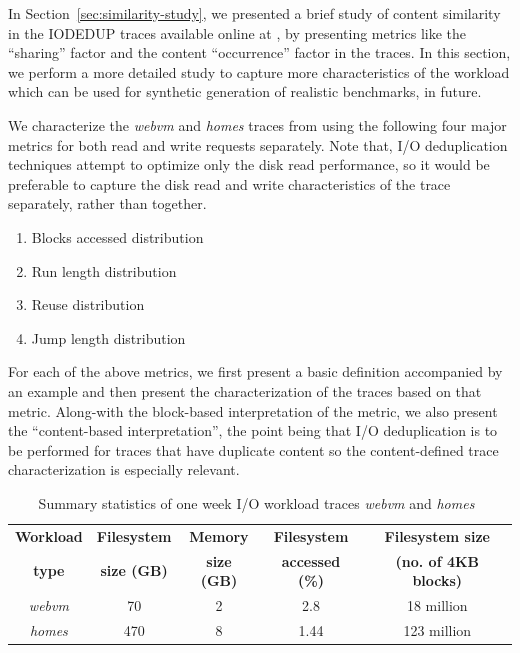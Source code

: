 In Section~\ref{sec:similarity-study}, we presented a brief study
of content similarity in the IODEDUP traces available online 
at \cite{iodedup-online}, by presenting 
metrics like the ``sharing'' factor and the content ``occurrence'' factor
in the traces. In this section, we perform a more detailed study
to capture more characteristics of the workload
which can be used for synthetic generation of realistic
benchmarks, in future.

We characterize the \textit{webvm} and \textit{homes} traces from \cite{iodedup-online}
using the following four major
metrics for both read and write requests separately. Note that, I/O
deduplication techniques attempt to optimize only the disk read performance,
so it would be preferable to capture the disk read and write characteristics
of the trace separately, rather than together. 
\begin{enumerate}
		\singlespacing
	\item Blocks accessed distribution
	\item Run length distribution
	\item Reuse distribution
	\item Jump length distribution
\end{enumerate}

For each of the above metrics, we first present a basic definition 
accompanied by an example and then present the characterization of the
traces based on that metric. Along-with the block-based interpretation of
the metric, we also present the ``content-based interpretation'', the point
being that I/O deduplication is to be performed for traces that have
duplicate content so the content-defined trace characterization is especially
relevant.

 \begin{table}[t]
 \caption{Summary statistics of one week I/O workload traces \textit{webvm} and \textit{homes}~\cite{iodedup}}
 \begin{center}
 \begin{tabular}{|c|c|c|c|c|} \hline
   \bf{Workload} & \bf{Filesystem} & \bf{Memory} & \bf{Filesystem} & \bf{Filesystem size} \\
  \bf{type} & \bf{size (GB)} & \bf{size (GB)} & \bf{accessed (\%)} & \bf{(no. of 4KB blocks)} \\ \hline
  \textit{webvm} & 70 & 2 & 2.8 & 18 million \\
  \textit{homes} & 470 & 8 & 1.44 & 123 million \\ \hline
 \end{tabular}
 \label{tab:tracechar-summary-stats}
 \end{center}
 \end{table}
 

